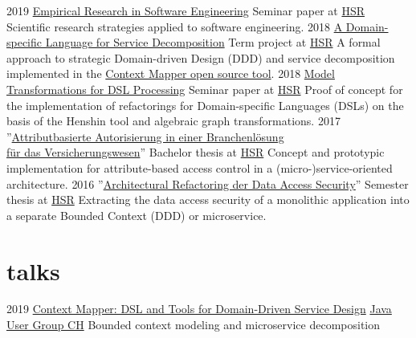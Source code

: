 \documentclass[]{cv-style}
\begin{document}
\begin{entrylist}
\entry
{2019}
{\href{https://github.com/stefan-ka/papers-and-publications/raw/master/empirical-research-in-software-engineering/FS19_SKapferer_Empirical-Research-in-Software-Engineering-Paper.pdf}{Empirical Research in Software Engineering}}
{Seminar paper at \href{https://www.hsr.ch}{HSR}}
{Scientific research strategies applied to software engineering.}
\entry
{2018}
{\href{https://eprints.hsr.ch/722/}{A Domain-specific Language for Service Decomposition}}
{Term project at \href{https://www.hsr.ch}{HSR}}
{A formal approach to strategic Domain-driven Design (DDD) and service decomposition implemented in the \href{https://contextmapper.org/}{Context Mapper open source tool}.}
\entry
{2018}
{\href{https://stefan.kapferer.ch/model-transformations-for-dsl-processing}{Model Transformations for DSL Processing}}
{Seminar paper at \href{https://www.hsr.ch}{HSR}}
{Proof of concept for the implementation of refactorings for Domain-specific Languages (DSLs) on the basis of the Henshin tool and algebraic graph transformations.}
\entry
{2017}
{''\href{https://eprints.hsr.ch/602/}{Attributbasierte Autorisierung in einer Branchenlösung\\für das Versicherungswesen}''}
{Bachelor thesis at \href{https://www.hsr.ch}{HSR}}
{Concept and prototypic implementation for attribute-based access control in a (micro-)service-oriented architecture.}
\entry
{2016}
{''\href{https://eprints.hsr.ch/564/}{Architectural Refactoring der Data Access Security}''}
{Semester thesis at \href{https://www.hsr.ch}{HSR}}
{Extracting the data access security of a monolithic application into a separate Bounded Context (DDD) or microservice.}
\end{entrylist}


\section{talks}

\begin{entrylist}
\entry
{2019}
{\href{https://www.jug.ch/html/events/2019/context_mapper.html}{Context Mapper: DSL and Tools for Domain-Driven Service Design}}
{\href{https://www.jug.ch/}{Java User Group CH}}
{Bounded context modeling and microservice decomposition}
\end{entrylist}
\end{document}
